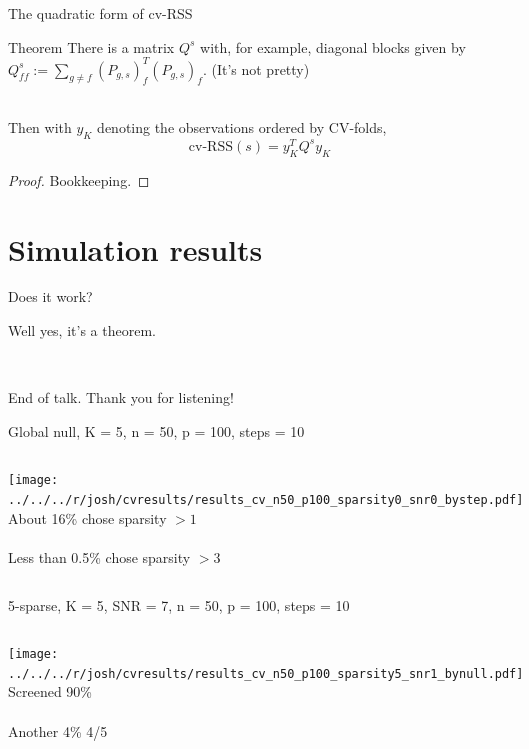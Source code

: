 \documentclass{beamer}
\begin{document}
\begin{frame}{The quadratic form of cv-RSS}
  
  \begin{block}{Theorem}
    There is a matrix $Q^s$ with, for example, diagonal blocks given by
    $Q^s_{ff} := \sum_{g\neq f}(P_{g,s})_f^T(P_{g,s})_f$. (It's not
    pretty) \\

\ 

    Then with $y_K$ denoting the observations ordered by CV-folds, 
    \[
    \text{cv-RSS}(s) = y_K^TQ^sy_K
    \]
  \end{block}
  
  \begin{proof}
    Bookkeeping.
  \end{proof}

\end{frame}

\section{Simulation results}
\label{sec:fs}

\begin{frame}{Does it work?}
  
  Well yes, it's a theorem. 

  \  

  End of talk. Thank you for listening!

\end{frame}

\begin{frame}{Global null, K = 5, n = 50, p = 100, steps = 10}
  
  \begin{columns}[c]
    \texttt{[image: ../../../r/josh/cvresults/results\_cv\_n50\_p100\_sparsity0\_snr0\_bystep.pdf]}
    About 16\% chose sparsity $> 1$ \\ \  \\ Less than 0.5\% chose sparsity $> 3$
  \end{columns}

\end{frame}

\begin{frame}{5-sparse, K = 5, SNR = 7, n = 50, p = 100, steps = 10}
  
  \begin{columns}[c]
    \texttt{[image: ../../../r/josh/cvresults/results\_cv\_n50\_p100\_sparsity5\_snr1\_bynull.pdf]}
    Screened 90\% \\ \  \\ Another 4\% 4/5
  \end{columns}
    
\end{frame}
\end{document}

